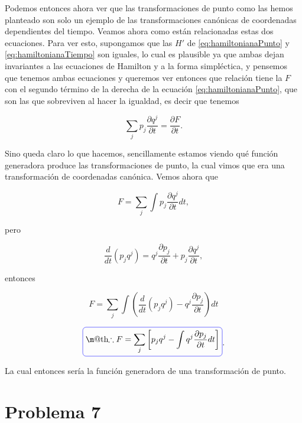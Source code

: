 \documentclass[a4paper,10pt]{article}
\makeatletter
\numberwithin{equation}{section}
\newcommand*{\boxcolor}{blue}
\renewcommand{\boxed}[1]{\textcolor{\boxcolor}{%
\tikz[baseline={([yshift=-1ex]current bounding box.center)}] \node [rectangle, minimum width=1ex,rounded corners,draw] {\normalcolor\m@th$\displaystyle#1$};}}
\makeatother
\begin{document}
Podemos entonces ahora ver que las transformaciones de punto como las hemos planteado 
son solo un ejemplo de las transformaciones canónicas de coordenadas dependientes 
del tiempo. Veamos ahora como están relacionadas estas dos ecuaciones. Para ver esto, 
supongamos que las $H'$ de \eqref{eq:hamiltonianaPunto} y \eqref{eq:hamiltonianaTiempo} 
son iguales, lo cual es plausible ya que ambas dejan invariantes a las ecuaciones 
de Hamilton y a la forma simpléctica, y pensemos que tenemos ambas ecuaciones 
y queremos ver entonces que relación tiene la $F$ con el segundo término de la 
derecha de la ecuación \eqref{eq:hamiltonianaPunto}, que son las que sobreviven 
al hacer la igualdad, es decir que tenemos 

\begin{equation}
 \sum_j p_j \frac{\partial q^j}{\partial t} = \frac{\partial F}{\partial t}.
\end{equation}

Sino queda claro lo que hacemos, sencillamente estamos viendo qué función generadora 
produce las transformaciones de punto, la cual vimos que era una transformación de 
coordenadas canónica. Vemos ahora que 

\begin{equation}
 F = \sum_j \int p_j \frac{\partial q^j}{\partial t}dt,
\end{equation}

pero 

\begin{equation}
 \frac{d}{dt}(p_jq^j) = q^j\frac{\partial p_j}{\partial t} +
 p_j\frac{\partial q^j}{\partial t},
\end{equation}

entonces 

\begin{equation}
 F = \sum_j \int \left(\frac{d}{dt}(p_j q^j) - q^j\frac{\partial p_j}{\partial t}\right)dt
\end{equation}

\begin{equation}
 \boxed{\therefore F = \sum_j \left[p_j q^j - \int q^j \frac{\partial p_j}{\partial t}dt\right]}.
\end{equation}


La cual entonces sería la función generadora de una transformación de punto.

\section{Problema 7}
\end{document}
